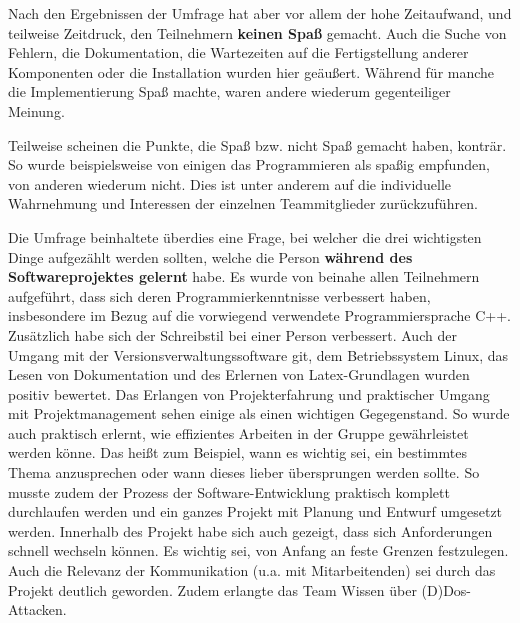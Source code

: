 \documentclass[../review_3.tex]{subfiles}
\begin{document}
Nach den Ergebnissen der Umfrage hat aber vor allem der hohe Zeitaufwand, und teilweise  Zeitdruck, den Teilnehmern \textbf{keinen Spaß} gemacht. Auch die Suche von Fehlern, die Dokumentation, die Wartezeiten auf die Fertigstellung anderer Komponenten oder die Installation wurden hier geäußert. Während für manche die Implementierung Spaß machte, waren andere wiederum gegenteiliger Meinung.

Teilweise scheinen die Punkte, die Spaß bzw. nicht Spaß gemacht haben, konträr. So wurde beispielsweise von einigen das Programmieren als spaßig empfunden, von anderen wiederum nicht. Dies ist unter anderem auf die individuelle Wahrnehmung und Interessen der einzelnen Teammitglieder zurückzuführen.

Die Umfrage beinhaltete überdies eine Frage, bei welcher die drei wichtigsten Dinge aufgezählt werden sollten, welche die Person \textbf{während des Softwareprojektes gelernt} habe.
Es wurde von beinahe allen Teilnehmern aufgeführt, dass sich deren Programmierkenntnisse verbessert haben, insbesondere im Bezug auf die vorwiegend verwendete Programmiersprache C++. Zusätzlich habe sich der Schreibstil bei einer Person verbessert. Auch der Umgang mit der Versionsverwaltungssoftware git, dem Betriebssystem Linux, das Lesen von Dokumentation und des Erlernen von Latex-Grundlagen wurden positiv bewertet. Das Erlangen von Projekterfahrung und praktischer Umgang mit Projektmanagement sehen einige als einen wichtigen Gegegenstand. So wurde auch praktisch erlernt, wie effizientes Arbeiten in der Gruppe gewährleistet werden könne. Das heißt zum Beispiel, wann es wichtig sei, ein bestimmtes Thema anzusprechen oder wann dieses lieber übersprungen werden sollte.
So musste zudem der Prozess der Software-Entwicklung praktisch komplett durchlaufen werden und ein ganzes Projekt mit Planung und Entwurf umgesetzt werden. Innerhalb des Projekt habe sich auch gezeigt, dass sich Anforderungen schnell wechseln können. Es wichtig sei, von Anfang an feste Grenzen festzulegen. Auch die Relevanz der Kommunikation (u.a. mit Mitarbeitenden) sei durch das Projekt deutlich geworden.
Zudem erlangte das Team Wissen über (D)Dos-Attacken.
\end{document}
